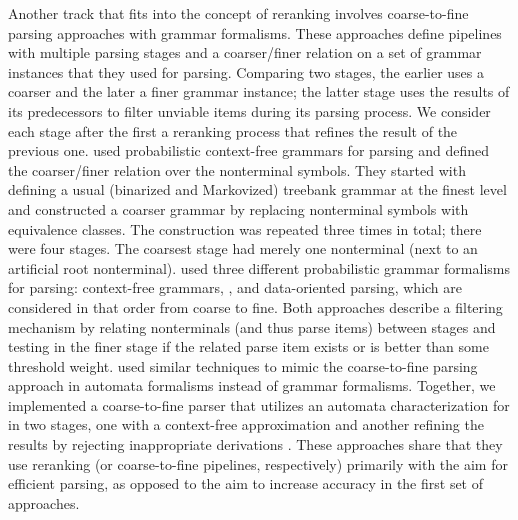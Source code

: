 \documentclass[../document.tex]{subfiles}
\begin{document}
    Another track that fits into the concept of reranking involves coarse-to-fine parsing approaches with grammar formalisms.
    These approaches define pipelines with multiple parsing stages and a coarser/finer relation on a set of grammar instances that they used for parsing.
    Comparing two stages, the earlier uses a coarser and the later a finer grammar instance; the latter stage uses the results of its predecessors to filter unviable items during its parsing process.
    We consider each stage after the first a reranking process that refines the result of the previous one.
     used probabilistic context-free grammars for parsing and defined the coarser/finer relation over the nonterminal symbols.
    They started with defining a usual (binarized and Markovized) treebank grammar at the finest level and constructed a coarser grammar by replacing nonterminal symbols with equivalence classes.
    The construction was repeated three times in total; there were four stages.
    The coarsest stage had merely one nonterminal (next to an artificial root nonterminal).
     used three different probabilistic grammar formalisms for parsing: context-free grammars, , and data-oriented parsing, which are considered in that order from coarse to fine.
    Both approaches describe a filtering mechanism by relating nonterminals (and thus parse items) between stages and testing in the finer stage if the related parse item exists or is better than some threshold weight.
     used similar techniques to mimic the coarse-to-fine parsing approach in automata formalisms instead of grammar formalisms.
    Together, we implemented a coarse-to-fine parser that utilizes an automata characterization for  in two stages, one with a context-free approximation and another refining the results by rejecting inappropriate derivations \citep{RupDen19}.
    These approaches share that they use reranking (or coarse-to-fine pipelines, respectively) primarily with the aim for efficient parsing, as opposed to the aim to increase accuracy in the first set of approaches.
\end{document}
